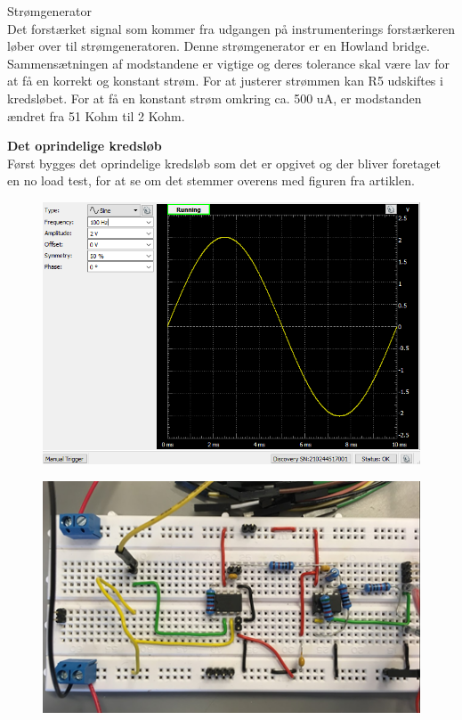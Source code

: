 Strømgenerator\\
Det forstærket signal som kommer fra udgangen på instrumenterings forstærkeren løber over til strømgeneratoren. Denne strømgenerator er en Howland bridge. Sammensætningen af modstandene er vigtige og deres tolerance skal være lav for at få en korrekt og konstant strøm. For at justerer strømmen kan R5 udskiftes i kredsløbet. For at få en konstant strøm omkring ca. 500 uA, er modstanden ændret fra 51 Kohm til 2 Kohm.  

\textbf{Det oprindelige kredsløb}\\
Først bygges det oprindelige kredsløb som det er opgivet og der bliver foretaget en no load test, for at se om det stemmer overens med figuren fra artiklen.

\begin{figure}[H]
\centering
\begin{minipage}{.5\textwidth}
  \centering
  \includegraphics[width=.9\linewidth]{Figure/VCCSwavegen1}
  \label{fig:test1}
\end{minipage}%
\begin{minipage}{.5\textwidth}
  \centering
  \includegraphics[width=.9\linewidth]{Figure/oprindeligekredslob}
  \label{fig:test2}
\end{minipage}
\end{figure}



